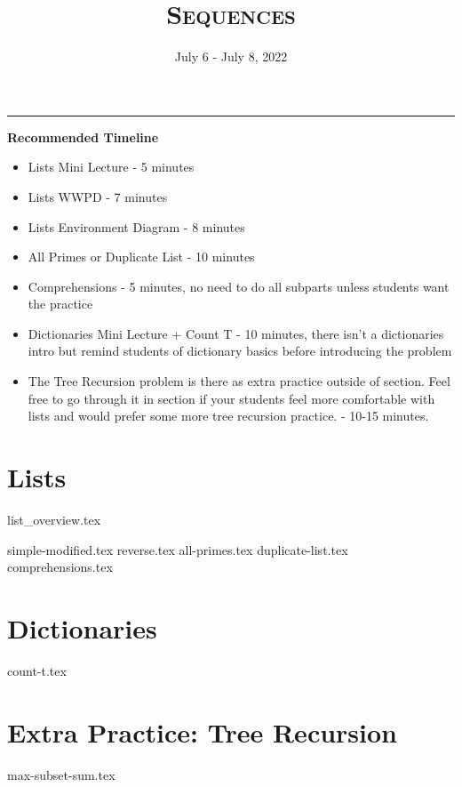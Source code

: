 \documentclass{exam}
\title{\textsc{Sequences}}
\date{July 6 - July 8, 2022}
\begin{document}
\maketitle
\rule{\textwidth}{0.15em}
\fontsize{12}{15}\selectfont


\begin{guide}
    \textbf{Recommended Timeline}
    \begin{itemize}
        \item Lists Mini Lecture - 5 minutes
        \item Lists WWPD - 7 minutes
        \item Lists Environment Diagram - 8 minutes
        \item All Primes or Duplicate List - 10 minutes
        \item Comprehensions - 5 minutes, no need to do all subparts unless students want the practice
        \item Dictionaries Mini Lecture + Count T - 10 minutes, there isn't a dictionaries intro but 
        remind students of dictionary basics before introducing the problem
        \item The Tree Recursion problem is there as extra practice outside of section. Feel free to go through it in section if your students feel more comfortable with lists
        and would prefer some more tree recursion practice. - 10-15 minutes.
    \end{itemize}
\end{guide}

\section{Lists}
{list_overview.tex}
\begin{questions}
    {simple-modified.tex}
    {reverse.tex}
    \newpage %
    {all-primes.tex}
    {duplicate-list.tex}
    {comprehensions.tex}
\end{questions}

\newpage

\section{Dictionaries}
\begin{questions}
    {count-t.tex}
\end{questions}

\newpage

\section{Extra Practice: Tree Recursion}
\begin{questions}
    {max-subset-sum.tex}
\end{questions}
\end{document}

